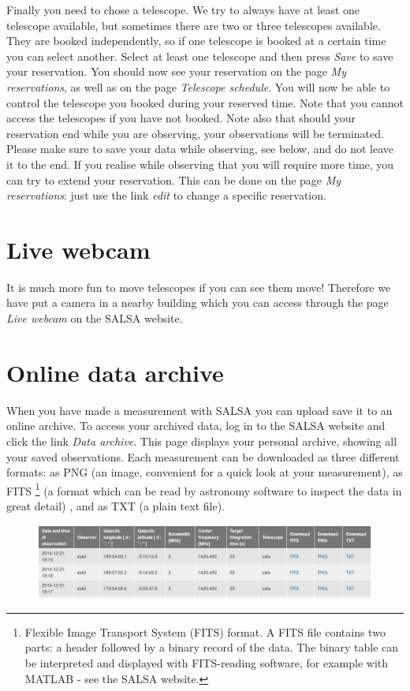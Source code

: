 Finally you need to chose a telescope. We try to always have at least one
telescope available, but sometimes there are two or three telescopes available.
They are booked independently, so if one telescope is booked at a certain time
you can select another.  Select at least one telescope and then press
\emph{Save} to save your reservation.  You should now see your reservation on
the page \emph{My reservations}, as well as on the page \emph{Telescope
schedule}. You will now be able to control the telescope you booked during your
reserved time. Note that you cannot access the telescopes if you have not
booked. Note also that should your reservation end while you are observing,
your observations will be terminated. Please make sure to save your data while
observing, see below, and do not leave it to the end. If you realise while
observing that you will require more time, you can try to extend your
reservation. This can be done on the page \emph{My reservations}: just use the
link \emph{edit} to change a specific reservation.

\section{Live webcam}
It is much more fun to move telescopes if you can see them move! Therefore
we have put a camera in a nearby building which you can access through the 
page \emph{Live webcam} on the SALSA website.

\section{Online data archive}
\label{sect:archive}
When you have made a measurement with SALSA you can upload save it to an online
archive. To access your archived data, log in to the SALSA website and click
the link \emph{Data archive}. This page displays your personal archive, showing
all your saved observations.  Each measurement can be downloaded as three
different formats: as PNG (an image, convenient for a quick look at your
measurement), as FITS \footnote{Flexible Image Transport System (FITS) format.
	A FITS file contains two parts: a header followed by a binary record of the
	data.  The binary table can be interpreted and displayed with FITS-reading
software, for example with MATLAB - see the SALSA website.} (a format which can
be read by astronomy software to inspect the data in great detail) , and as TXT
(a plain text file). 
\begin{figure}[h]
\centering
\includegraphics[width=\textwidth]{../figures/SALSA_archive.png}
\end{figure}
